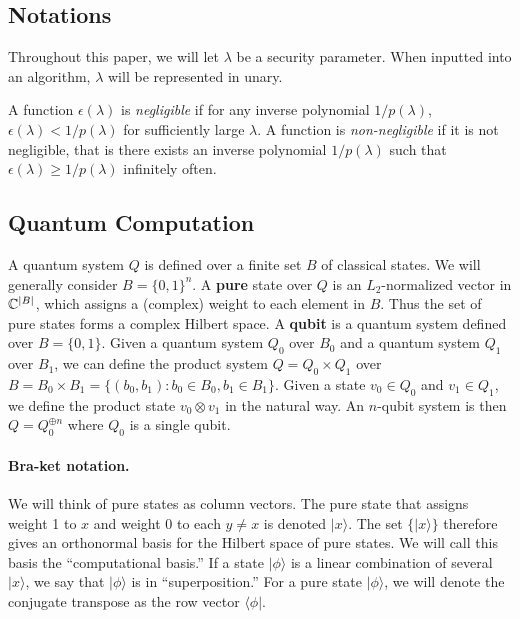 \label{sec:prelim}

\subsection{Notations}

Throughout this paper, we will let $\lambda$ be a security parameter.  When inputted into an algorithm, $\lambda$ will be represented in unary.

A function $\epsilon(\lambda)$ is \emph{negligible} if for any inverse polynomial $1/p(\lambda)$, $\epsilon(\lambda)<1/p(\lambda)$ for sufficiently large $\lambda$.  A function is \emph{non-negligible} if it is not negligible, that is there exists an inverse polynomial $1/p(\lambda)$ such that $\epsilon(\lambda)\geq 1/p(\lambda)$ infinitely often.



\subsection{Quantum Computation}

A quantum system $Q$ is defined over a finite set $B$ of classical states.  We will generally consider $B=\{0,1\}^n$.  A {\bf pure} state over $Q$ is an $L_2$-normalized vector in $\mathbb{C}^{|B|}$, which assigns a (complex) weight to each element in $B$.  Thus the set of pure states forms a complex Hilbert space.  A {\bf qubit} is a quantum system defined over $B=\{0,1\}$.  Given a quantum system $Q_0$ over $B_0$ and a quantum system $Q_1$ over $B_1$, we can define the product system $Q=Q_0\times Q_1$ over $B=B_0\times B_1=\{(b_0,b_1):b_0\in B_0,b_1\in B_1\}$.  Given a state $v_0\in Q_0$ and $v_1\in Q_1$, we define the product state $v_0\otimes v_1$ in the natural way.  An $n$-qubit system is then $Q=Q_0^{\oplus n}$ where $Q_0$ is a single qubit.
\paragraph{Bra-ket notation.} We will think of pure states as column vectors.  The pure state that assigns weight 1 to $x$ and weight 0 to each $y\neq x$ is denoted $|x\rangle$.  The set $\{|x\rangle\}$ therefore gives an orthonormal basis for the Hilbert space of pure states.  We will call this basis the ``computational basis.''  If a state $|\phi\rangle$ is a linear combination of several $|x\rangle$, we say that $|\phi\rangle$ is in ``superposition.''  For a pure state $|\phi\rangle$, we will denote the conjugate transpose as the row vector $\langle\phi |$. 
